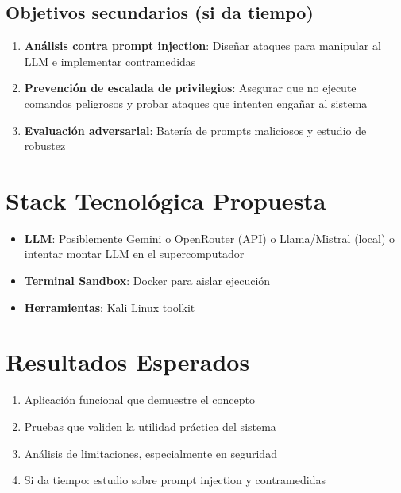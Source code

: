 \documentclass[12pt,a4paper]{article}
\begin{document}
\subsection{Objetivos secundarios (si da tiempo)}

\begin{enumerate}[leftmargin=*]
    \item \textbf{Análisis contra prompt injection}: Diseñar ataques para manipular al LLM e implementar contramedidas
    
    \item \textbf{Prevención de escalada de privilegios}: Asegurar que no ejecute comandos peligrosos y probar ataques que intenten engañar al sistema
    
    \item \textbf{Evaluación adversarial}: Batería de prompts maliciosos y estudio de robustez
\end{enumerate}

\section{Stack Tecnológica Propuesta}

\begin{itemize}[leftmargin=*]
    \item \textbf{LLM}: Posiblemente Gemini o OpenRouter (API) o Llama/Mistral (local) o intentar montar LLM en el supercomputador
    \item \textbf{Terminal Sandbox}: Docker para aislar ejecución
    \item \textbf{Herramientas}: Kali Linux toolkit
\end{itemize}

\section{Resultados Esperados}

\begin{enumerate}[leftmargin=*]
    \item Aplicación funcional que demuestre el concepto
    \item Pruebas que validen la utilidad práctica del sistema
    \item Análisis de limitaciones, especialmente en seguridad
    \item Si da tiempo: estudio sobre prompt injection y contramedidas
\end{enumerate}

\vspace{1cm}
\end{document}

